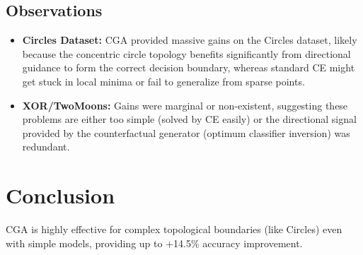 \documentclass{article}
\begin{document}
\subsection{Observations}
\begin{itemize}
    \item \textbf{Circles Dataset:} CGA provided massive gains on the Circles dataset, likely because the concentric circle topology benefits significantly from directional guidance to form the correct decision boundary, whereas standard CE might get stuck in local minima or fail to generalize from sparse points.
    \item \textbf{XOR/TwoMoons:} Gains were marginal or non-existent, suggesting these problems are either too simple (solved by CE easily) or the directional signal provided by the counterfactual generator (optimum classifier inversion) was redundant.
\end{itemize}

\section{Conclusion}
CGA is highly effective for complex topological boundaries (like Circles) even with simple models, providing up to +14.5\% accuracy improvement.
\end{document}

